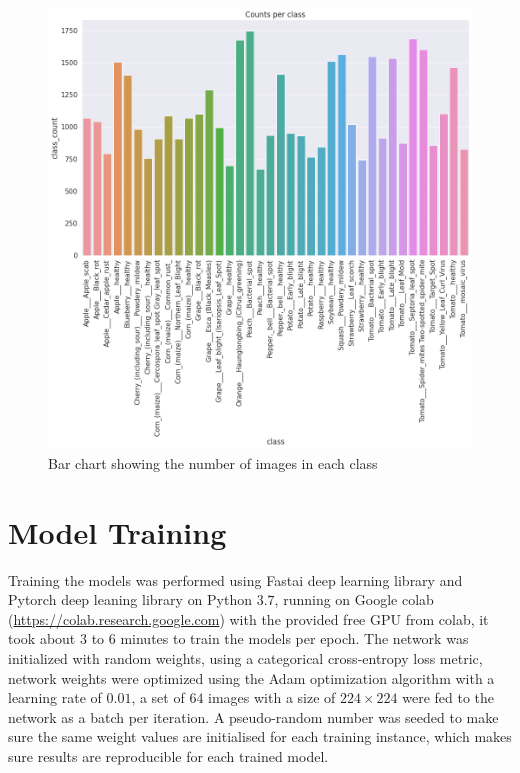 \documentclass[12pt]{report}
\numberwithin{equation}{section}
\begin{document}
\begin{figure}[H]
\centering
\includegraphics[scale=0.3]{png/counts_per_class.png}
\caption{Bar chart showing the number of images in each class}
\label{fig:count}
\end{figure} 

\section{Model Training}
Training the models was performed using Fastai deep learning library {\cite{Howard_2020}} and Pytorch deep leaning library {\cite{NEURIPS2019_9015}} on Python $3.7$, running on Google colab (\url{https://colab.research.google.com}) with the provided free GPU from colab, it took about $3$ to $6$ minutes to train the models per epoch. The network was initialized with random weights, using a categorical cross-entropy loss metric, network weights were optimized using the Adam optimization algorithm with a learning rate of $0.01$, a set of $64$ images with a size of $224 \times 224$ were fed to the network as a batch per iteration. A pseudo-random number was seeded to make sure the same weight values are initialised for each training instance, which makes sure results are reproducible for each trained model.
\end{document}
